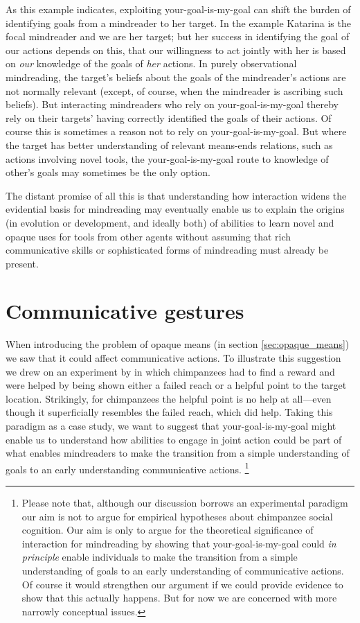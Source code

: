 \documentclass[14pt,a4paper]{extarticle}
\begin{document}
As this example indicates,
exploiting your-goal-is-my-goal 
can shift the burden of identifying goals from a mindreader to her target.
In the example Katarina is the focal mindreader and we are her target;
but her success in identifying the goal of our actions
depends on this,
that our willingness to act jointly with her is based on \emph{our} knowledge of the goals of \emph{her} actions.
In purely observational mindreading, the target's beliefs about the goals of the mindreader's actions are not normally relevant (except, of course, when the mindreader is ascribing such beliefs).
But interacting mindreaders who rely on your-goal-is-my-goal
thereby rely on their targets' having correctly identified the goals of their actions.
Of course this is sometimes a reason not to rely on your-goal-is-my-goal.
But where the target has better understanding of relevant means-ends relations,
such as actions involving novel tools,
the your-goal-is-my-goal route to knowledge of other's goals may sometimes be the only option.

The distant promise of all this is that 
understanding how interaction widens the evidential basis for mindreading
may eventually enable us to explain
the origins (in evolution or development, and ideally both) of abilities to learn novel and opaque uses for tools from other agents
without assuming that 
rich communicative skills
or 
sophisticated forms of mindreading 
must already be  present.


\section{Communicative gestures}
When introducing the problem of opaque means 
(in section \vref{sec:opaque_means})
we saw that it could  affect
communicative actions.
To illustrate this suggestion we drew on 
an experiment by \citet{hare_chimpanzees_2004}
in which chimpanzees had to find a reward 
and were helped by being shown either a failed reach or  a helpful point to the target location.
Strikingly, for chimpanzees the helpful point is no help at all---even though it superficially resembles the failed reach, which  did help.
Taking this paradigm as a case study, 
we want to suggest that your-goal-is-my-goal might 
enable us to understand how abilities to engage in joint action 
could be part of what enables mindreaders to make the transition from 
a simple understanding of goals 
to 
an early understanding communicative actions.%
\footnote{
Please note that, although our discussion borrows an experimental paradigm
our aim is not to argue for empirical hypotheses about chimpanzee social cognition.
Our aim is only to argue for the theoretical significance of interaction for mindreading by showing 
that your-goal-is-my-goal
could \emph{in principle} enable
individuals to make the transition 
from
 a simple understanding of goals
to
 an early understanding of communicative actions.
Of course it would strengthen our argument if we could provide evidence to show that this actually happens.
But for now we are concerned with more narrowly conceptual issues.
}
\end{document}
